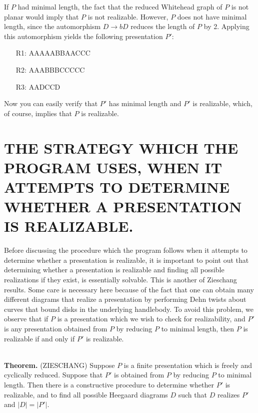 \documentclass[12pt]{amsart}
\newcommand{\theorem}{\ \\ \noindent  \textbf{Theorem.} }
\begin{document}
                If $P$ had minimal length, the fact that the reduced Whitehead graph of $P$ is not
        planar would imply that $P$ is not realizable. However, $P$ does not have minimal length,
        since the automorphism $D \to bD$ reduces the length of $P$ by 2. Applying this automorphism
        yields the following presentation $P'$:
       \begin{enumerate}
                \item[R1:]           AAAAABBAACCC
                \item[R2:]           AAABBBCCCCC
                \item[R3:]           AADCCD
        \end{enumerate}                
        Now you can easily verify that $P'$ has minimal length and $P'$ is realizable, which,
        of course, implies that $P$ is realizable.


        
        \section{THE STRATEGY WHICH THE PROGRAM USES, WHEN IT ATTEMPTS TO DETERMINE WHETHER A PRESENTATION IS REALIZABLE.}

                Before discussing the procedure which the program follows when it attempts to
        determine whether a presentation is realizable, it is important to point out that 
        determining whether a presentation is realizable and finding all possible realizations
        if they exist, is essentially solvable. This is another of Zieschang results. Some
        care is necessary here because of the fact that one can obtain many different diagrams
        that realize a presentation by performing Dehn twists about curves that bound disks in
        the underlying handlebody. To avoid this problem, we observe that if $P$ is a presentation
        which we wish to check for realizability, and $P'$ is any presentation obtained from $P$ by
        reducing $P$ to minimal length, then $P$ is realizable if and only if $P'$ is realizable.               
        
\theorem (ZIESCHANG) Suppose $P$ is a finite presentation which is freely and cyclically
        reduced. Suppose that $P'$ is obtained from $P$ by reducing $P$ to minimal length. Then there
        is a constructive procedure to determine whether $P'$ is realizable, and to find all
        possible Heegaard diagrams $D$ such that $D$ realizes $P'$ and $|D| = |P'|$.
        
\end{document}
